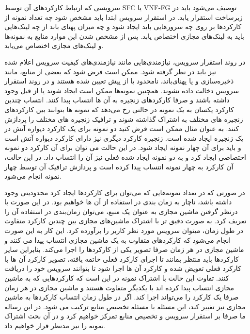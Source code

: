 سرویسی که ارتباط کارکردهای آن توسط SFC یا VNF-FG توصیف می‌شود باید در زیرساخت استقرار یابد.
در استقرار سرویس ابتدا باید مشخص شود چه تعداد نمونه از کارکردها بر روی چه سرورهایی باید ایجاد شود و چه میزان پهنای باند از چه لینک‌هایی باید به لینک‌های مجازی اختصاص یابد.
پس از مشخص شدن این موارد منابع به نمونه‌ها و لینک‌های مجازی اختصاص می‌یابد.

در روند استقرار سرویس، نیازمندی‌هایی مانند نیازمندی‌های کیفیت سرویس اعلام شده نیز باید در نظر گرفته شود.
ممکن است فرض شود که بعضی از منابع، مانند ذخیره‌سازی و یا پهنای‌باند، نامحدود یا از پیش تعیین شده هستند و در روند استقرار سرویس دخالت داده نشوند.
همچنین نمونه‌ها ممکن است ایجاد شوند یا از قبل وجود داشته باشند و صرفا کارکردهای زنجیره به آن ها انتساب پیدا کنند.
انتساب چندین کارکرد یکسان به یک نمونه در حالتی رخ می‌دهد که نمونه ها بتوانند بین کارکردهای زنجیره های مختلف به اشتراک گذاشته شوند و ترافیک زنجیره های مختلف را پردازش کنند.
به عنوان مثال ممکن است فرض کنید دو نمونه برای یک کارکرد دیواره آتش در یک زنجیره ایجاد شده است. زنجیره کارکرد دیگری نیز دارای کارکرد دیواره آتش است و باید برای آن چهار نمونه ایجاد شود.
در این حالت می توان برای آن کارکرد دو نمونه اختصاصی ایجاد کرد و به دو نمونه ایجاد شده فعلی نیز آن را انتساب داد.
در این حالت، آن کارکرد به چهار نمونه انتساب پیدا کرده است و پردازش ترافیک آن توسط چهار نمونه انجام می‌شود.

در صورتی که در تعداد نمونه‌هایی که می‌توان برای کارکردها ایجاد کرد محدودیتی وجود داشته باشد، ناچار به زمان بندی در استفاده از آن ها خواهیم بود.
در این صورت با درنظر گرفتن ماشین مجازی به عنوان یک منبع، می‌توان زمان‌بندی در استفاده آن را تعریف کرد.
به صورت دقیق تر با اشتراک ماشین‌های مجازی بین چندین کارکرد متفاوت در طول زمان، میتوان سرویس مورد نظر کاربر را برآورده کرد.
این کار به این صورت انجام می‌شود که کارکردهای متفاوت به یک ماشین مجازی انتساب پیدا می کنند و ماشین مجازی در هر زمان صرفا تصویر یکی از کارکردها را اجرا می‌کند.
بنابراین سایر کارکردها باید منتظر بمانند تا اجرای کارکرد فعلی خاتمه یافته، تصویر کارکرد آن ها با کارکرد فعلی تعویض شده و کارکرد آن ها اجرا شود تا بتوانند سرویس خود را دریافت کنند.
تفاوت این حالت با اشتراک نمونه در این است که کارکردهایی که به ماشین مجازی انتساب پیدا کرده اند با یکدیگر متفاوت هستند و ماشین مجازی در هر زمان صرفا یک کارکرد را می‌تواند اجرا کند.
اگر در طول زمان انتساب کارکردها به ماشین مجازی نیز تغییر کند، این مسئله با مسئله تخصیص منابع ترکیب می شود.
در این رساله ما صرفا بر استقرار سرویس و تخصیص منابع تمرکز خواهیم کرد و در آن بحث اشتراک نمونه را نیز مدنظر قرار خواهیم داد.


